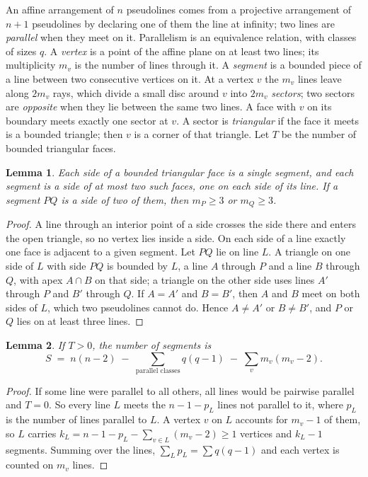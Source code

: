 \documentclass[11pt]{article}
\newtheorem{lemma}{Lemma}
\theoremstyle{definition}
\theoremstyle{remark}
\begin{document}
An affine arrangement of $n$ pseudolines comes from a projective arrangement of $n+1$ pseudolines
by declaring one of them the line at infinity; two lines are \emph{parallel} when they meet on it.
Parallelism is an equivalence relation, with classes of sizes $q$. A \emph{vertex} is a point of the
affine plane on at least two lines; its multiplicity $m_v$ is the number of lines through it. A
\emph{segment} is a bounded piece of a line between two consecutive vertices on it. At a vertex $v$
the $m_v$ lines leave along $2m_v$ rays, which divide a small disc around $v$ into $2m_v$
\emph{sectors}; two sectors are \emph{opposite} when they lie between the same two lines. A face
with $v$ on its boundary meets exactly one sector at $v$. A sector is \emph{triangular} if the face
it meets is a bounded triangle; then $v$ is a corner of that triangle. Let $T$ be the number of
bounded triangular faces.

\begin{lemma}\label{lem:segments}
Each side of a bounded triangular face is a single segment, and each segment is a side of at most
two such faces, one on each side of its line. If a segment $PQ$ is a side of two of them, then
$m_P \ge 3$ or $m_Q \ge 3$.
\end{lemma}
\begin{proof}
A line through an interior point of a side crosses the side there and enters the open triangle, so
no vertex lies inside a side. On each side of a line exactly one face is adjacent to a given
segment. Let $PQ$ lie on line $L$. A triangle on one side of $L$ with side $PQ$ is bounded by $L$, a
line $A$ through $P$ and a line $B$ through $Q$, with apex $A \cap B$ on that side; a triangle on the
other side uses lines $A'$ through $P$ and $B'$ through $Q$. If $A = A'$ and $B = B'$, then $A$ and
$B$ meet on both sides of $L$, which two pseudolines cannot do. Hence $A \ne A'$ or $B \ne B'$, and
$P$ or $Q$ lies on at least three lines.
\end{proof}

\begin{lemma}\label{lem:count}
If $T > 0$, the number of segments is
\[
  S \;=\; n(n-2) \;-\; \sum_{\text{parallel classes}} q(q-1) \;-\; \sum_{v} m_v(m_v-2).
\]
\end{lemma}
\begin{proof}
If some line were parallel to all others, all lines would be pairwise parallel and $T = 0$. So
every line $L$ meets the $n-1-p_L$ lines not parallel to it, where $p_L$ is the number of lines
parallel to $L$. A vertex $v$ on $L$ accounts for $m_v - 1$ of them, so $L$ carries
$k_L = n - 1 - p_L - \sum_{v \in L}(m_v - 2) \ge 1$ vertices and $k_L - 1$ segments. Summing over
the lines, $\sum_L p_L = \sum q(q-1)$ and each vertex is counted on $m_v$ lines.
\end{proof}
\end{document}
